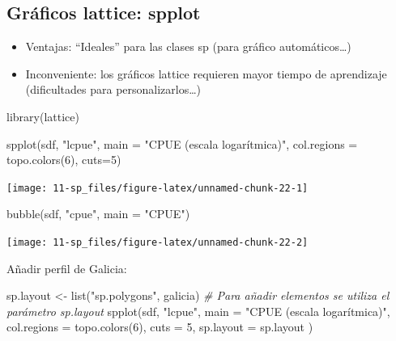 \documentclass[
  spanish,
]{book}
\newenvironment{Shaded}{\begin{snugshade}}{\end{snugshade}}
\newcommand{\AttributeTok}[1]{\textcolor[rgb]{0.77,0.63,0.00}{#1}}
\newcommand{\CommentTok}[1]{\textcolor[rgb]{0.56,0.35,0.01}{\textit{#1}}}
\newcommand{\DecValTok}[1]{\textcolor[rgb]{0.00,0.00,0.81}{#1}}
\newcommand{\FunctionTok}[1]{\textcolor[rgb]{0.00,0.00,0.00}{#1}}
\newcommand{\NormalTok}[1]{#1}
\newcommand{\OtherTok}[1]{\textcolor[rgb]{0.56,0.35,0.01}{#1}}
\newcommand{\StringTok}[1]{\textcolor[rgb]{0.31,0.60,0.02}{#1}}
\theoremstyle{break}
\begin{document}
\hypertarget{gruxe1ficos-lattice-spplot}{%
\subsection{Gráficos lattice: spplot}\label{gruxe1ficos-lattice-spplot}}

\begin{itemize}
\item
  Ventajas: ``Ideales'' para las clases sp (para gráfico automáticos\ldots)
\item
  Inconveniente: los gráficos lattice requieren mayor tiempo de aprendizaje (dificultades para personalizarlos\ldots)
\end{itemize}

\begin{Shaded}
\begin{Highlighting}[]
\FunctionTok{library}\NormalTok{(lattice)}

\FunctionTok{spplot}\NormalTok{(sdf, }\StringTok{"lcpue"}\NormalTok{, }\AttributeTok{main =} \StringTok{"CPUE (escala logarítmica)"}\NormalTok{, }
       \AttributeTok{col.regions =} \FunctionTok{topo.colors}\NormalTok{(}\DecValTok{6}\NormalTok{), }\AttributeTok{cuts=}\DecValTok{5}\NormalTok{)}
\end{Highlighting}
\end{Shaded}

\begin{center}\texttt{[image: 11-sp\_files/figure-latex/unnamed-chunk-22-1]} \end{center}

\begin{Shaded}
\begin{Highlighting}[]
\FunctionTok{bubble}\NormalTok{(sdf, }\StringTok{"cpue"}\NormalTok{, }\AttributeTok{main =} \StringTok{"CPUE"}\NormalTok{) }
\end{Highlighting}
\end{Shaded}

\begin{center}\texttt{[image: 11-sp\_files/figure-latex/unnamed-chunk-22-2]} \end{center}

Añadir perfil de Galicia:

\begin{Shaded}
\begin{Highlighting}[]
\NormalTok{sp.layout }\OtherTok{\textless{}{-}} \FunctionTok{list}\NormalTok{(}\StringTok{"sp.polygons"}\NormalTok{, galicia)   }\CommentTok{\# Para añadir elementos se utiliza el parámetro sp.layout}
\FunctionTok{spplot}\NormalTok{(sdf, }\StringTok{"lcpue"}\NormalTok{, }\AttributeTok{main =} \StringTok{"CPUE (escala logarítmica)"}\NormalTok{, }
       \AttributeTok{col.regions =} \FunctionTok{topo.colors}\NormalTok{(}\DecValTok{6}\NormalTok{), }\AttributeTok{cuts =} \DecValTok{5}\NormalTok{, }\AttributeTok{sp.layout =}\NormalTok{ sp.layout )}
\end{Highlighting}
\end{Shaded}
\end{document}
